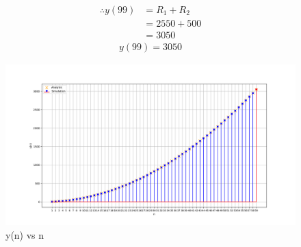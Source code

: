 \documentclass[journal,12pt,twocolumn]{IEEEtran}
\begin{document}
	\begin{align}
		\therefore y(99)&= R_1 + R_2 \\
		 &= 2550 + 500\\
		 &= 3050
	\end{align}
	\begin{align}
		\boxed{y(99)=3050}
	\end{align}
	\begin{figure}[ht]
		\includegraphics[width = \linewidth]{figs/fig1}
		\caption{y(n) vs n}
		\centering
		\label{fig: fig1}
	\end{figure}
\end{document}
